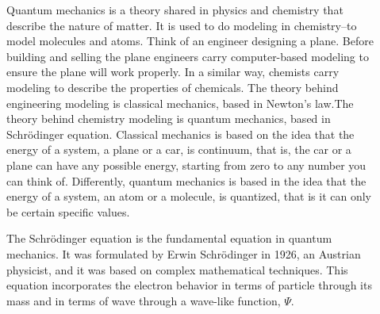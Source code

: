 \documentclass[main.tex]{subfiles}
\begin{document}
\sloppy
\begin{description}
\item[] 
Quantum mechanics is a theory shared in physics and chemistry that describe the nature of matter. It is used to do modeling in chemistry--to model molecules and atoms. Think of an engineer designing a plane. Before building and selling the plane engineers carry computer-based modeling to ensure the plane will work properly. In a similar way, chemists carry modeling to describe the properties of chemicals. The theory behind engineering modeling is classical mechanics, based in Newton's law.The theory behind chemistry modeling is quantum mechanics, based in Schr\"{o}dinger equation. Classical mechanics is based on the idea that the energy of a system, a plane or a car, is continuum, that is, the car or a plane can have any possible energy, starting from zero to any number you can think of. 
Differently, quantum mechanics is based in the idea that the energy of a system, an atom or a molecule, is quantized, that is it can only be certain specific values. 
 \item[] 
The Schr\"{o}dinger equation is the fundamental equation in quantum mechanics. It was formulated by Erwin Schr\"{o}dinger in 1926, an Austrian physicist, and it was based on complex mathematical techniques. This equation incorporates the electron behavior in terms of particle through its mass and in terms of wave through a wave-like function, $\Psi$.
 \begin{equation*}\begin{split}

\end{split}
\end{equation*}
\end{description}
\end{document}
